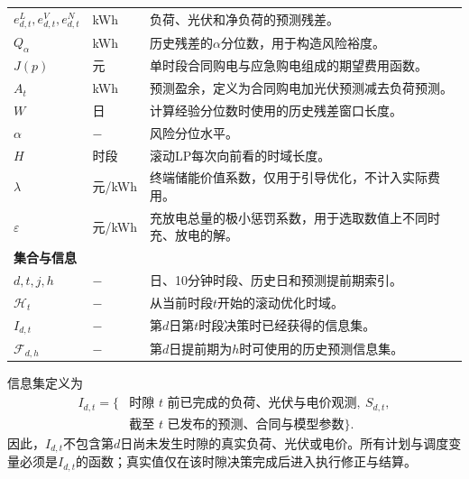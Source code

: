 {\begin{longtable}{p{}p{}p{}}
$e^L_{d,t},e^V_{d,t},e^N_{d,t}$ & kWh & 负荷、光伏和净负荷的预测残差。 \\
$Q_\alpha$ & kWh & 历史残差的$\alpha$分位数，用于构造风险裕度。 \\
$J(p)$ & 元 & 单时段合同购电与应急购电组成的期望费用函数。 \\
$A_t$ & kWh & 预测盈余，定义为合同购电加光伏预测减去负荷预测。 \\
$W$ & 日 & 计算经验分位数时使用的历史残差窗口长度。 \\
$\alpha$ & $-$ & 风险分位水平。 \\
$H$ & 时段 & 滚动LP每次向前看的时域长度。 \\
$\lambda$ & 元/kWh & 终端储能价值系数，仅用于引导优化，不计入实际费用。 \\
$\varepsilon$ & 元/kWh & 充放电总量的极小惩罚系数，用于选取数值上不同时充、放电的解。 \\
\midrule
\multicolumn{3}{l}{\textbf{集合与信息}}\\
$d,t,j,h$ & $-$ & 日、10分钟时段、历史日和预测提前期索引。 \\
$\mathcal H_t$ & $-$ & 从当前时段$t$开始的滚动优化时域。 \\
$I_{d,t}$ & $-$ & 第$d$日第$t$时段决策时已经获得的信息集。 \\
$\mathcal F_{d,h}$ & $-$ & 第$d$日提前期为$h$时可使用的历史预测信息集。 \\
\bottomrule
\end{longtable}
}

信息集定义为
\[
\begin{aligned}
I_{d,t}=\{&\text{时隙 }t\text{ 前已完成的负荷、光伏与电价观测},\ S_{d,t},\\
&\text{截至 }t\text{ 已发布的预测、合同与模型参数}\}.
\end{aligned}
\]
因此，$I_{d,t}$不包含第$d$日尚未发生时隙的真实负荷、光伏或电价。所有计划与调度变量必须是$ I_{d,t}$的函数；真实值仅在该时隙决策完成后进入执行修正与结算。
